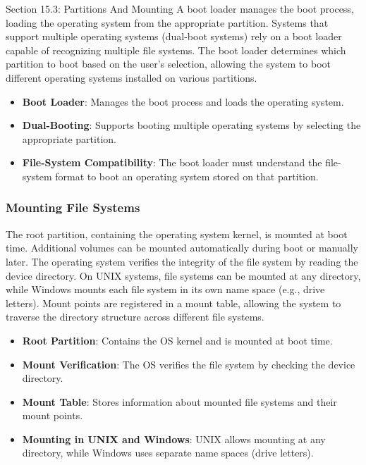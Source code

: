 \begin{notes}{Section 15.3: Partitions And Mounting}
    A boot loader manages the boot process, loading the operating system from the appropriate partition. Systems that support multiple operating systems (dual-boot systems) rely on a boot loader capable of 
    recognizing multiple file systems. The boot loader determines which partition to boot based on the user's selection, allowing the system to boot different operating systems installed on various partitions.
    
    \begin{highlight}
    
        \begin{itemize}
            \item \textbf{Boot Loader}: Manages the boot process and loads the operating system.
            \item \textbf{Dual-Booting}: Supports booting multiple operating systems by selecting the appropriate partition.
            \item \textbf{File-System Compatibility}: The boot loader must understand the file-system format to boot an operating system stored on that partition.
        \end{itemize}
    
    \end{highlight}
    
    \subsubsection*{Mounting File Systems}
    
    The root partition, containing the operating system kernel, is mounted at boot time. Additional volumes can be mounted automatically during boot or manually later. The operating system verifies the 
    integrity of the file system by reading the device directory. On UNIX systems, file systems can be mounted at any directory, while Windows mounts each file system in its own name space (e.g., drive letters). 
    Mount points are registered in a mount table, allowing the system to traverse the directory structure across different file systems.
    
    \begin{highlight}
    
        \begin{itemize}
            \item \textbf{Root Partition}: Contains the OS kernel and is mounted at boot time.
            \item \textbf{Mount Verification}: The OS verifies the file system by checking the device directory.
            \item \textbf{Mount Table}: Stores information about mounted file systems and their mount points.
            \item \textbf{Mounting in UNIX and Windows}: UNIX allows mounting at any directory, while Windows uses separate name spaces (drive letters).
        \end{itemize}
    

\end{highlight}
\end{notes}
